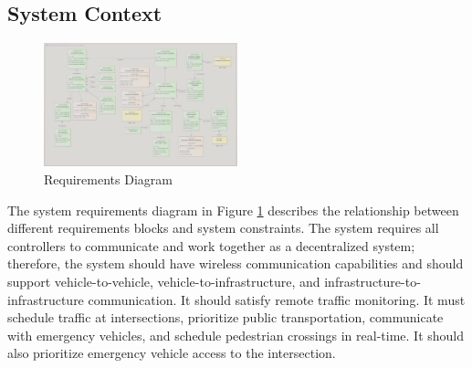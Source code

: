 \subsection{System Context}
\label{subsec:requirements}
\begin{figure}[ht]
    \centering
    \includegraphics[width=0.5\textwidth]{images/requirements.png}
    \caption{Requirements Diagram}
    \label{img:system_bdd}
\end{figure}
The system requirements diagram in Figure \ref{img:system_bdd} describes the relationship between different requirements blocks and system constraints. The system requires all controllers to communicate and work together as a decentralized system; therefore, the system should have wireless communication capabilities and should support vehicle-to-vehicle, vehicle-to-infrastructure, and infrastructure-to-infrastructure communication. It should satisfy remote traffic monitoring. It must schedule traffic at intersections, prioritize public transportation, communicate with emergency vehicles, and schedule pedestrian crossings in real-time. It should also prioritize emergency vehicle access to the intersection.